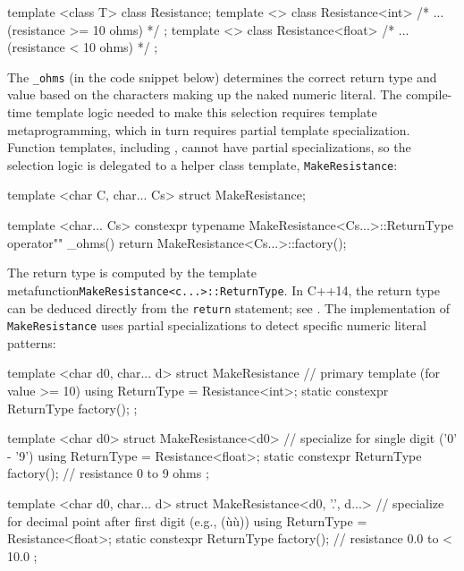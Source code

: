 \begin{emcppslisting}[emcppsbatch=e12]
template <class T> class Resistance;
template <> class Resistance<int>   { /* ... (resistance >= 10 ohms) */ };
template <> class Resistance<float> { /* ... (resistance <  10 ohms) */ };
\end{emcppslisting}
    
\noindent The \lstinline!_ohms!  (in the code snippet below) determines the correct
return type and value based on the characters making up the naked
numeric literal. The compile-time template logic needed to make this
selection requires template metaprogramming, which in turn requires
partial template specialization. Function templates, including
, cannot have partial specializations,
so the selection logic is delegated to a helper class template,
\lstinline!MakeResistance!:

\begin{emcppslisting}[emcppsbatch=e12]
template <char C, char... Cs> struct MakeResistance;

template <char... Cs>
constexpr typename MakeResistance<Cs...>::ReturnType
operator"" _ohms() { return MakeResistance<Cs...>::factory(); }
\end{emcppslisting}
    
\noindent The return type is computed by the template metafunction\linebreak[4]%
\lstinline!MakeResistance<c...>::ReturnType!. In C++14, the return type can
be deduced directly from the \lstinline!return! statement; see .
The implementation of \lstinline!MakeResistance! uses partial
specializations to detect specific numeric literal patterns:

\begin{emcppslisting}[emcppsbatch=e12]
template <char d0, char... d>
struct MakeResistance
{
    // primary template (for value >= 10)
    using ReturnType = Resistance<int>;
    static constexpr ReturnType factory();
};

template <char d0>
struct MakeResistance<d0>
{
    // specialize for single digit ('0' - '9')
    using ReturnType = Resistance<float>;
    static constexpr ReturnType factory(); // resistance 0 to 9 ohms
};

template <char d0, char... d>
struct MakeResistance<d0, '.', d...>
{
    // specialize for decimal point after first digit (e.g., (ù{}ù))
    using ReturnType = Resistance<float>;
    static constexpr ReturnType factory(); // resistance 0.0 to < 10.0
};
\end{emcppslisting}
    
